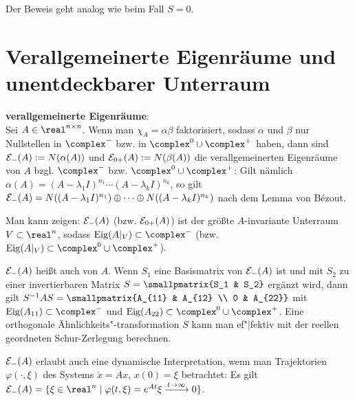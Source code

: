 Der Beweis geht analog wie beim Fall $S = 0$.

\pagebreak

\section{%
    Verallgemeinerte Eigenräume und unentdeckbarer Unterraum%
}

\textbf{verallgemeinerte Eigenräume}:\\
Sei $A \in \real^{n \times n}$.
Wenn man $\chi_A = \alpha \beta$ faktorisiert, sodass $\alpha$ und $\beta$ nur Nullstellen
in $\complex^-$ bzw. in $\complex^0 \cup \complex^+$ haben, dann
sind $\mathcal{E}_-(A) := N(\alpha(A))$ und $\mathcal{E}_{0+}(A) := N(\beta(A))$
die verallgemeinerten Eigenräume von $A$ bzgl. $\complex^-$ bzw. $\complex^0 \cup \complex^+$:
Gilt nämlich $\alpha(A) = (A - \lambda_1 I)^{n_1} \dotsm (A - \lambda_k I)^{n_k}$,
so gilt $\mathcal{E}_-(A) = N((A - \lambda_1 I)^{n_1}) \oplus \dotsb \oplus N((A - \lambda_k I)^{n_k})$
nach dem Lemma von Bézout.

Man kann zeigen: $\mathcal{E}_-(A)$ (bzw. $\mathcal{E}_{0+}(A)$)
ist der größte $A$-invariante Unterraum $V \subset \real^n$,
sodass $\Eig(A|_V) \subset \complex^-$ (bzw. $\Eig(A|_V) \subset \complex^0 \cup \complex^+$).

$\mathcal{E}_-(A)$ heißt auch  von $A$.
Wenn $S_1$ eine Basismatrix von $\mathcal{E}_-(A)$ ist und mit $S_2$ zu einer invertierbaren Matrix
$S = \smallpmatrix{S_1 & S_2}$ ergänzt wird, dann gilt
$S^{-1} AS = \smallpmatrix{A_{11} & A_{12} \\ 0 & A_{22}}$ mit
$\Eig(A_{11}) \subset \complex^-$ und $\Eig(A_{22}) \subset \complex^0 \cup \complex^+$.
Eine orthogonale Ähnlichkeits"-transformation $S$ kann man ef"|fektiv mit der
reellen geordneten Schur-Zerlegung berechnen.

$\mathcal{E}_-(A)$ erlaubt auch eine dynamische Interpretation,
wenn man Trajektorien $\varphi(\cdot, \xi)$ des Systems $\dot{x} = Ax$, $x(0) = \xi$ betrachtet:
Es gilt $\E_-(A) = \{\xi \in \real^n \;|\;
\varphi(t, \xi) = e^{At}\xi \xrightarrow{t \to \infty} 0\}$.

\linie

